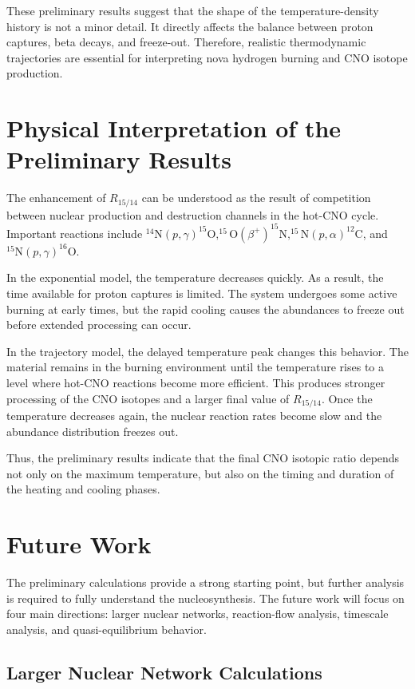 These preliminary results suggest that the shape of the temperature-density history is not a minor detail. It directly affects the balance between proton captures, beta decays, and freeze-out. Therefore, realistic thermodynamic trajectories are essential for interpreting nova hydrogen burning and CNO isotope production.

\section{Physical Interpretation of the Preliminary Results}

The enhancement of $R_{15/14}$ can be understood as the result of competition between nuclear production and destruction channels in the hot-CNO cycle. Important reactions include $^{14}\mathrm{N}(p,\gamma)^{15}\mathrm{O}, ^{15}\mathrm{O}(\beta^+)^{15}\mathrm{N}, ^{15}\mathrm{N}(p,\alpha)^{12}\mathrm{C}$, and $ ^{15}\mathrm{N}(p,\gamma)^{16}\mathrm{O}$.

In the exponential model, the temperature decreases quickly. As a result, the time available for proton captures is limited. The system undergoes some active burning at early times, but the rapid cooling causes the abundances to freeze out before extended processing can occur.

In the trajectory model, the delayed temperature peak changes this behavior. The material remains in the burning environment until the temperature rises to a level where hot-CNO reactions become more efficient. This produces stronger processing of the CNO isotopes and a larger final value of $R_{15/14}$. Once the temperature decreases again, the nuclear reaction rates become slow and the abundance distribution freezes out.

Thus, the preliminary results indicate that the final CNO isotopic ratio depends not only on the maximum temperature, but also on the timing and duration of the heating and cooling phases.

\section{Future Work}

The preliminary calculations provide a strong starting point, but further analysis is required to fully understand the nucleosynthesis. The future work will focus on four main directions: larger nuclear networks, reaction-flow analysis, timescale analysis, and quasi-equilibrium behavior.

\subsection{Larger Nuclear Network Calculations}

